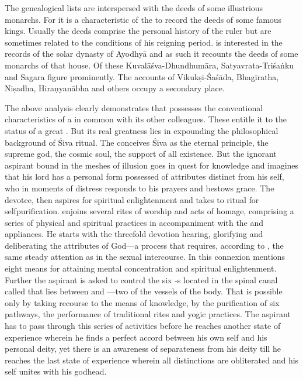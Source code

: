 The genealogical lists are interspersed with the deeds of some illustrious
monarchs. For it is a characteristic of the  to record the deeds
of some famous kings. Usually the deeds comprise the personal history of
the ruler but are sometimes related to the conditions of his reigning period.
 is interested in the records of the solar dynasty of Ayodhyā and
as such it recounts the deeds of some monarchs of that house. Of these
Kuvalāśva-Dhundhumāra, Satyavrata-Triśaṅku and Sagara figure prominently.
The accounts of Vikukṣi-Śaśāda, Bhagīratha, Niṣadha, Hiraṇyanābha and others
occupy a secondary place.

The above analysis clearly demonstrates that  possesses the
conventional characteristics of a  in common with its other
colleagues. These entitle it to the status of a great . But its real
greatness lies in expounding the philosophical background of Śiva ritual.
The  conceives Śiva as the eternal principle, the supreme god,
the cosmic soul, the support of all existence. But the ignorant aspirant bound
in the meshes of illusion goes in quest for knowledge and imagines that his lord
has a personal form possessed of attributes distinct from his self, who in
moments of distress responds to his prayers and bestows grace. The devotee,
then aspires for spiritual enlightenment and takes to ritual for
selfpurification.  enjoins several rites of worship and acts of
homage, comprising a series of physical and spiritual practices in accompaniment
with the  and  appliances. He starts with
the threefold devotion \viz hearing, glorifying and deliberating the attributes
of God—a process that requires, according to , the same steady
attention as in the sexual intercourse. In this connexion 
mentions eight means for attaining mental concentration and spiritual
enlightenment. Further the aspirant is asked to control the six -s
located in the spinal canal called  that lies between  and
—two of the vessels of the body. That is possible only by taking
recourse to the means of knowledge, by the purification of six pathways,
the performance of traditional rites and yogic practices. The aspirant has to pass
through this series of activities before he reaches another state of experience
wherein he finds a perfect accord between his own self and his personal deity,
yet there is an awareness of separateness from his deity till he reaches the last
state of experience wherein all distinctions are obliterated and his self unites
with his godhead.
\clearpage
